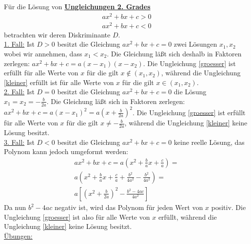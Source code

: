 \documentclass[a4paper, twoside, parskip, 10pt, smallheadings]{scrbook}
\theoremstyle{plain}
\theoremstyle{definition}
\begin{document}
\noindent F\"{u}r die L\"{o}sung von \underline{\bf Ungleichungen 2. Grades}
\begin{eqnarray}
ax^2+bx+c>0 \label{groesser}\\
ax^2+bx+c<0 \label{kleiner}
\end{eqnarray}
betrachten wir deren Diskriminante $D$. \\
\underline{1. Fall:} Ist $D>0$ besitzt die Gleichung $ax^2+bx+c=0$ zwei L\"{o}sungen
$x_1,x_2$ wobei wir annehmen, dass $x_1<x_2$. Die Gleichung l\"{a}{\ss}t sich deshalb in
Faktoren zerlegen: $ax^2+bx+c=a(x-x_1)(x-x_2)$. Die Ungleichung \ref{groesser} ist
erf\"{u}llt f\"{u}r alle Werte von $x$ f\"{u}r die gilt $x\not\in (x_1,x_2)$, w\"{a}hrend die
Ungleichung \ref{kleiner}
erf\"{u}llt ist f\"{u}r alle Werte von $x$ f\"{u}r die gilt $x\in (x_1,x_2)$.\\
\underline{2. Fall:} Ist $D=0$ besitzt die Gleichung $ax^2+bx+c=0$ die L\"{o}sung
$x_1=x_2=-\frac{b}{2a}$. Die Gleichung l\"{a}{\ss}t sich in Faktoren zerlegen:
$ax^2+bx+c=a(x-x_1)^2=a(x+\frac{b}{2a})^2$. Die Ungleichung \ref{groesser} ist erf\"{u}llt
f\"{u}r alle Werte von $x$ f\"{u}r die gilt $x\not=-\frac{b}{2a}$, w\"{a}hrend die Ungleichung
\ref{kleiner}
keine L\"{o}sung besitzt.\\
\underline{3. Fall:} Ist $D<0$ besitzt die Gleichung $ax^2+bx+c=0$ keine reelle
L\"{o}sung, das Polynom kann jedoch umgeformt werden:
     \begin{eqnarray}   ax^2+bx+c=a(x^2+\frac{b}{a}x+\frac{c}{a})=\\
       a(x^2+\frac{b}{a}x+\frac{c}{a}+\frac{b^2}{4a^2}-\frac{b^2}{4a^2})=\\
        a[(x^2+\frac{b}{2a})^2-\frac{b^2-4ac}{4a^2}]
     \end{eqnarray}
 Da nun $b^2-4ac$ negativ ist, wird das Polynom f\"{u}r jeden Wert von $x$ positiv.
Die Ungleichung \ref{groesser} ist also f\"{u}r alle Werte von $x$ erf\"{u}llt,
w\"{a}hrend die Ungleichung \ref{kleiner} keine L\"{o}sung besitzt.\\
\underline{\"{U}bungen:}\\
\end{document}
